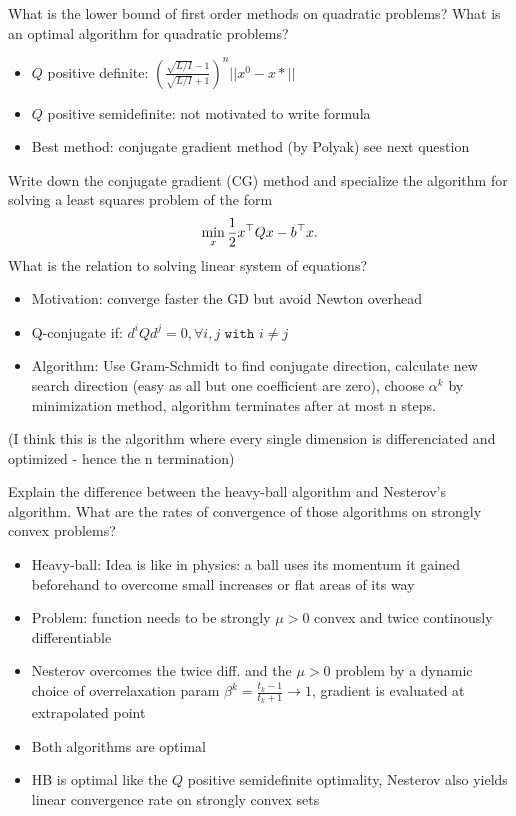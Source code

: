 \documentclass{article}
\begin{document}
\begin{question}
  What is the lower bound of first order methods on quadratic problems?  What is an optimal
  algorithm for quadratic problems?
\end{question}
\begin{itemize}
\item $Q$ positive definite: $\left(\frac{\sqrt{L/I}-1}{\sqrt{L/I} + 1}\right)^n || x^0  - x* ||$
\item $Q$ positive semidefinite: not motivated to write formula
\item Best method: conjugate gradient method (by Polyak) see next question
\end{itemize}

\begin{question}
  Write down the conjugate gradient (CG) method and specialize the algorithm for solving a least
  squares problem of the form
  \[
    \min_x \frac{1}{2} x^{\top} Q x - b^{\top} x.
  \]
  What is the relation to solving linear system of equations?
\end{question}
\begin{itemize}
\item Motivation: converge faster the GD but avoid Newton overhead
\item Q-conjugate if: $d^i  Q d^j = 0, \forall i, j \texttt{ with } i \neq j$
\item Algorithm: Use Gram-Schmidt to find conjugate direction, calculate new search direction (easy
  as all but one coefficient are zero), choose $\alpha^k$ by minimization method, algorithm
  terminates after at most n steps.
\end{itemize}
(I think this is the algorithm where every single dimension is differenciated and optimized - hence
the n termination)

\begin{question}
  Explain the difference between the heavy-ball algorithm and Nesterov’s algorithm. What are the
  rates of convergence of those algorithms on strongly convex problems?
\end{question}
\begin{itemize}
\item Heavy-ball: Idea is like in physics: a ball uses its momentum it gained beforehand to overcome
  small increases or flat areas of its way
\item Problem: function needs to be strongly $\mu > 0$ convex and twice continously differentiable
\item Nesterov overcomes the twice diff. and the $\mu > 0$ problem by a dynamic choice of
  overrelaxation param $\beta^k = \frac{t_k - 1}{t_k + 1} \rightarrow 1$, gradient is evaluated at
  extrapolated point
\item Both algorithms are optimal
\item HB is optimal like the $Q$ positive semidefinite optimality, Nesterov also yields linear
  convergence rate on strongly convex sets
\end{itemize}
\end{document}
